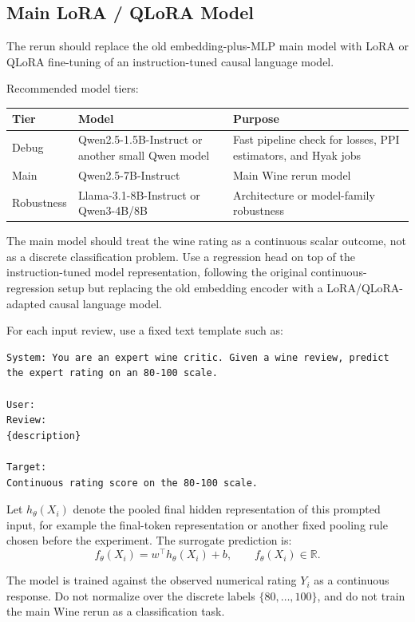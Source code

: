 \documentclass[11pt]{article}
\begin{document}
\subsection{Main LoRA / QLoRA Model}

The rerun should replace the old embedding-plus-MLP main model with LoRA or QLoRA fine-tuning of an instruction-tuned causal language model.

Recommended model tiers:

\begin{longtable}{p{}p{}p{}}
\toprule
Tier & Model & Purpose \\
\midrule
Debug & Qwen2.5-1.5B-Instruct or another small Qwen model & Fast pipeline check for losses, PPI estimators, and Hyak jobs \\
Main & Qwen2.5-7B-Instruct & Main Wine rerun model \\
Robustness & Llama-3.1-8B-Instruct or Qwen3-4B/8B & Architecture or model-family robustness \\
\bottomrule
\end{longtable}

The main model should treat the wine rating as a continuous scalar outcome, not as a discrete classification problem. Use a regression head on top of the instruction-tuned model representation, following the original continuous-regression setup but replacing the old embedding encoder with a LoRA/QLoRA-adapted causal language model.

For each input review, use a fixed text template such as:

\begin{lstlisting}
System: You are an expert wine critic. Given a wine review, predict the expert rating on an 80-100 scale.

User:
Review:
{description}

Target:
Continuous rating score on the 80-100 scale.
\end{lstlisting}

Let $h_\theta(X_i)$ denote the pooled final hidden representation of this prompted input, for example the final-token representation or another fixed pooling rule chosen before the experiment. The surrogate prediction is:
\[
f_\theta(X_i)=w^\top h_\theta(X_i)+b,
\qquad f_\theta(X_i)\in\mathbb{R}.
\]

The model is trained against the observed numerical rating $Y_i$ as a continuous response. Do not normalize over the discrete labels $\{80,\ldots,100\}$, and do not train the main Wine rerun as a classification task.
\end{document}
